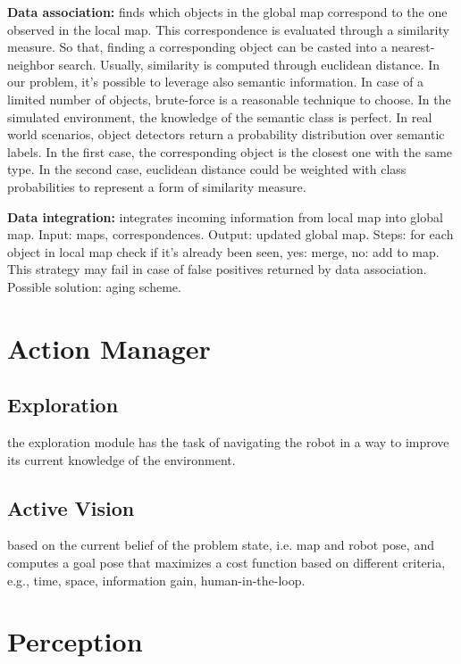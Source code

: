 \documentclass{article}
\begin{document}
	\begin{description}
		\item{\bf Data association:} finds which objects in the global map correspond to the one observed in the local map. This correspondence is evaluated through a similarity measure. So that, finding a corresponding object can be casted into a nearest-neighbor search. Usually, similarity is computed through euclidean distance. In our problem, it's possible to leverage also semantic information. In case of a limited number of objects, brute-force is a reasonable technique to choose. In the simulated environment, the knowledge of the semantic class is perfect. In real world scenarios, object detectors return a probability distribution over semantic labels. In the first case, the corresponding object is the closest one with the same type. In the second case, euclidean distance could be weighted with class probabilities to represent a form of similarity measure.
		
		\item{\bf Data integration:} integrates incoming information from local map into global map. Input: maps, correspondences. Output: updated global map. Steps: for each object in local map check if it's already been seen, yes: merge, no: add to map. This strategy may fail in case of false positives returned by data association. Possible solution:  aging scheme.
	\end{description}
	
	\section{Action Manager}
	
	\subsection{Exploration} the exploration module has the task of navigating the robot in a way to improve its current knowledge of the environment. 
	
	\subsection{Active Vision} based on the current belief of the problem state, i.e. map and robot pose, and computes a goal pose that maximizes a cost function based on different criteria, e.g., time, space, information gain, human-in-the-loop.
		
	\section{Perception}
\end{document}

